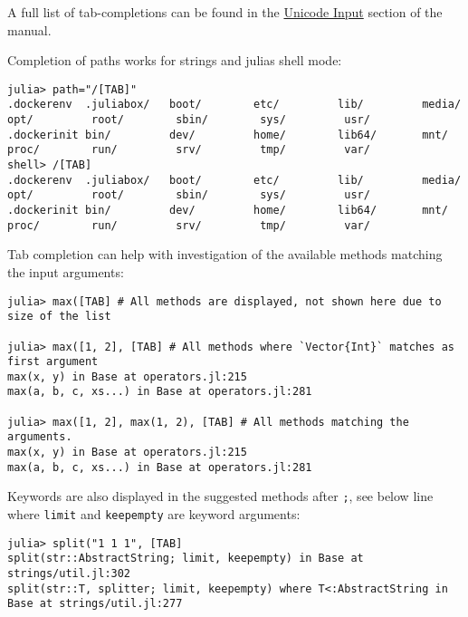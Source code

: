 A full list of tab-completions can be found in the \hyperlink{12388770544499622804}{Unicode Input} section of the manual.



Completion of paths works for strings and julia{\textquotesingle}s shell mode:




\begin{verbatim}
julia> path="/[TAB]"
.dockerenv  .juliabox/   boot/        etc/         lib/         media/       opt/         root/        sbin/        sys/         usr/
.dockerinit bin/         dev/         home/        lib64/       mnt/         proc/        run/         srv/         tmp/         var/
shell> /[TAB]
.dockerenv  .juliabox/   boot/        etc/         lib/         media/       opt/         root/        sbin/        sys/         usr/
.dockerinit bin/         dev/         home/        lib64/       mnt/         proc/        run/         srv/         tmp/         var/
\end{verbatim}



Tab completion can help with investigation of the available methods matching the input arguments:




\begin{verbatim}
julia> max([TAB] # All methods are displayed, not shown here due to size of the list

julia> max([1, 2], [TAB] # All methods where `Vector{Int}` matches as first argument
max(x, y) in Base at operators.jl:215
max(a, b, c, xs...) in Base at operators.jl:281

julia> max([1, 2], max(1, 2), [TAB] # All methods matching the arguments.
max(x, y) in Base at operators.jl:215
max(a, b, c, xs...) in Base at operators.jl:281
\end{verbatim}



Keywords are also displayed in the suggested methods after \texttt{;}, see below line where \texttt{limit} and \texttt{keepempty} are keyword arguments:




\begin{verbatim}
julia> split("1 1 1", [TAB]
split(str::AbstractString; limit, keepempty) in Base at strings/util.jl:302
split(str::T, splitter; limit, keepempty) where T<:AbstractString in Base at strings/util.jl:277
\end{verbatim}



